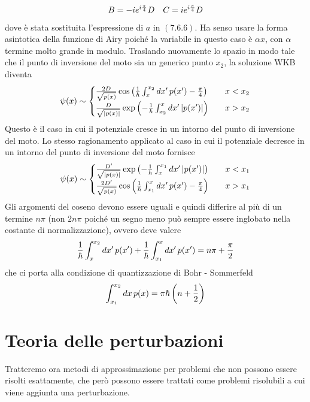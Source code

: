 \documentclass{article}
\begin{document}
\begin{gather}
    B = -ie^{i\frac{\pi}{4}}D \quad C = ie^{i\frac{\pi}{4}}D \notag
\end{gather}
dove è stata sostituita l'espressione di $a$ in $(7.6.6)$. Ha senso usare la forma asintotica della funzione di Airy poiché la variabile in questo caso è $\alpha x$, con $\alpha$ termine molto grande in modulo. Traslando nuovamente lo spazio in modo tale che il punto di inversione del moto sia un generico punto $x_2$, la soluzione WKB diventa
\begin{gather}
    \psi(x) \sim \begin{cases}
        \frac{2D}{\sqrt{p(x)}}\cos\left( \frac{1}{\hbar}\int_x^{x_2} dx' \, p(x') - \frac{\pi}{4} \right) \quad &x < x_2 \\
        \frac{D}{\sqrt{|p(x)|}}\exp\left( -\frac{1}{\hbar}\int_{x_2}^x dx' \, |p(x')| \right) \quad &x > x_2
    \end{cases} \notag
\end{gather}
Questo è il caso in cui il potenziale cresce in un intorno del punto di inversione del moto. Lo stesso ragionamento applicato al caso in cui il potenziale decresce in un intorno del punto di inversione del moto fornisce
\begin{gather}
    \psi(x) \sim \begin{cases}
        \frac{D'}{\sqrt{|p(x)|}}\exp\left( -\frac{1}{\hbar}\int_x^{x_1} dx' \, |p(x')| \right) \quad &x < x_1 \\
        \frac{2D'}{\sqrt{p(x)}}\cos\left( \frac{1}{\hbar}\int_{x_1}^x dx' \, p(x') - \frac{\pi}{4} \right) \quad &x > x_1
    \end{cases} \notag
\end{gather}
Gli argomenti del coseno devono essere uguali e quindi differire al più di un termine $n\pi$ (non $2n\pi$ poiché un segno meno può sempre essere inglobato nella costante di normalizzazione), ovvero deve valere
\begin{gather}
    \frac{1}{\hbar}\int_x^{x_2}dx' \, p(x') + \frac{1}{\hbar}\int_{x_1}^x dx' \, p(x') = n\pi + \frac{\pi}{2} \notag
\end{gather}
che ci porta alla condizione di quantizzazione di Bohr - Sommerfeld 
\begin{gather}
    \int_{x_1}^{x_2}dx \, p(x) = \pi\hbar\left( n + \frac{1}{2} \right) \notag
\end{gather}

\newpage
\section{Teoria delle perturbazioni}
Tratteremo ora metodi di approssimazione per problemi che non possono essere risolti esattamente, che però possono essere trattati come problemi risolubili a cui viene aggiunta una perturbazione.
\end{document}
